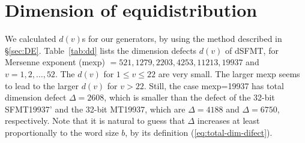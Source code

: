 \documentclass{svmult}
\begin{document}
\section{Dimension of equidistribution}
\label{sec:equidistribution}
We calculated $d(v)$s for our generators, by using the method described
in \S\ref{sec:DE}.
Table~\ref{tab:dd} lists the dimension defects $d(v)$ of dSFMT, for
Mersenne exponent (mexp) $= 521, 1279, 2203, 4253, 11213, 19937$ and
$v=1,2,\ldots, 52$.  The $d(v)$ for $1 \le v \le 22$ are very small.
The larger mexp
seems to lead to the larger $d(v)$ for $v>22$. Still, the case mexp=19937 has
total dimension defect $\Delta=2608$, which is smaller than the defect of
the 32-bit SFMT19937' and the 32-bit MT19937, which are $\Delta=4188$ and
$\Delta=6750$, respectively.
Note that it is natural to guess that
$\Delta$ increases at least proportionally to the word size $b$,
by its definition (\ref{eq:total-dim-difect}).
\end{document}
